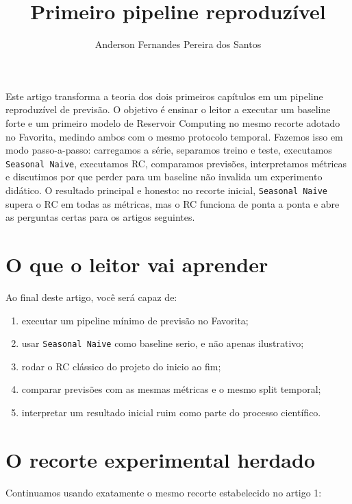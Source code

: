 \documentclass[12pt]{article}
\title{Primeiro pipeline reproduzível}
\author{Anderson Fernandes Pereira dos Santos}
\providecommand{\tightlist}{%
              \setlength{\itemsep}{0pt}\setlength{\parskip}{0pt}}
\begin{document}
            \maketitle

            \begin{resumo}
            Este artigo transforma a teoria dos dois primeiros capítulos em um pipeline reproduzível de previsão. O objetivo é ensinar o leitor a executar um baseline forte e um primeiro modelo de Reservoir Computing no mesmo recorte adotado no Favorita, medindo ambos com o mesmo protocolo temporal. Fazemos isso em modo passo-a-passo: carregamos a série, separamos treino e teste, executamos \texttt{Seasonal\ Naive}, executamos RC, comparamos previsões, interpretamos métricas e discutimos por que perder para um baseline não invalida um experimento didático. O resultado principal e honesto: no recorte inicial, \texttt{Seasonal\ Naive} supera o RC em todas as métricas, mas o RC funciona de ponta a ponta e abre as perguntas certas para os artigos seguintes.
            \end{resumo}

            \section{O que o leitor vai aprender}\label{1-o-que-o-leitor-vai-aprender}

Ao final deste artigo, você será capaz de:

\begin{enumerate}
\def\labelenumi{\arabic{enumi}.}
\tightlist
\item
  executar um pipeline mínimo de previsão no Favorita;
\item
  usar \texttt{Seasonal\ Naive} como baseline serio, e não apenas ilustrativo;
\item
  rodar o RC clássico do projeto do inicio ao fim;
\item
  comparar previsões com as mesmas métricas e o mesmo split temporal;
\item
  interpretar um resultado inicial ruim como parte do processo científico.
\end{enumerate}

\section{O recorte experimental herdado}\label{2-o-recorte-experimental-herdado}

Continuamos usando exatamente o mesmo recorte estabelecido no artigo 1:
\end{document}
